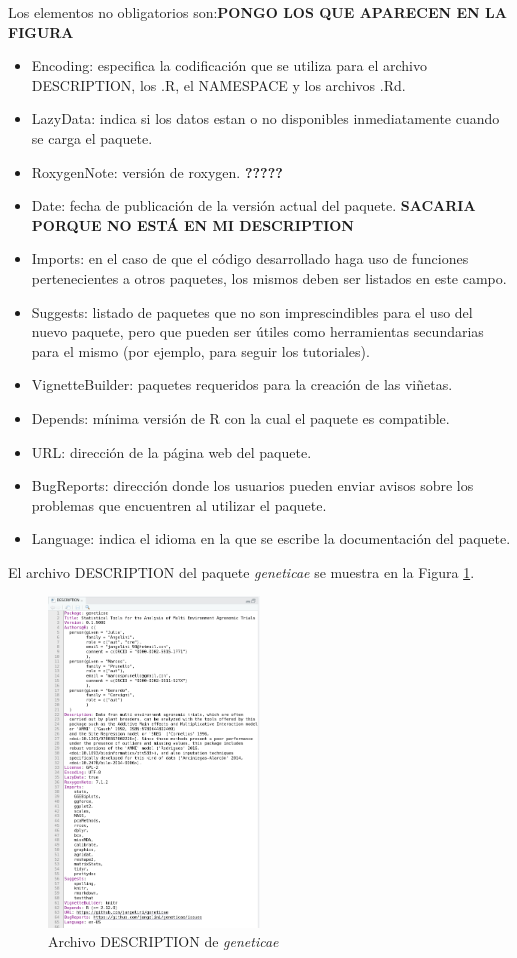 Los elementos no obligatorios son:\textbf{PONGO LOS QUE APARECEN EN LA FIGURA}

\begin{itemize}
\item Encoding: especifica la codificación que se utiliza para el archivo DESCRIPTION, los .R, el NAMESPACE y los archivos .Rd.
\item LazyData: indica si los datos estan o no disponibles inmediatamente cuando se carga el paquete.
\item RoxygenNote: versión de roxygen. \textbf{?????}
\item Date: fecha de publicación de la versión actual del paquete. \textbf{SACARIA PORQUE NO ESTÁ EN MI DESCRIPTION}
\item Imports: en el caso de que el código desarrollado haga uso de funciones pertenecientes a otros paquetes, los mismos deben ser listados en este campo.
\item Suggests: listado de paquetes que no son imprescindibles para el uso del nuevo paquete, pero que pueden ser útiles como herramientas secundarias para el mismo (por ejemplo, para seguir los tutoriales).
\item VignetteBuilder: paquetes requeridos para la creación de las viñetas.
\item Depends: mínima versión de R con la cual el paquete es compatible.
\item URL: dirección de la página web del paquete.
\item BugReports: dirección donde los usuarios pueden enviar avisos sobre los problemas que encuentren al utilizar el paquete.
\item Language: indica el idioma en la que se escribe la documentación del paquete.
\end{itemize}

El archivo DESCRIPTION del paquete \emph{geneticae} se muestra en la Figura \ref{fig:fig33}.
\begin{figure}[h]
	\begin{center}
		\includegraphics[width=0.50\textwidth]{./Graficos/DESCRIPTION.png}	
	\end{center}
	\caption{Archivo DESCRIPTION de \emph{geneticae}}
	\label{fig:fig33}
\end{figure}


